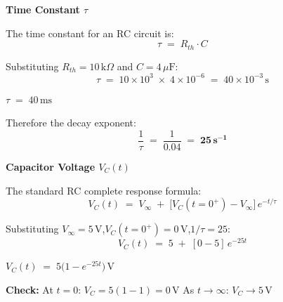 \documentclass[12pt]{beamer}
\begin{document}
\begin{frame}{\textbf{Time Constant $\tau$}}
  \begin{center}
    \vfill
    The time constant for an RC circuit is:
    \[
      \tau \;=\; R_{th} \cdot C
    \]

    \vspace{0.8em}
    Substituting $R_{th} = 10\,\mathrm{k}\Omega$ and $C = 4\,\mu\mathrm{F}$:
    \[
      \tau \;=\; 10 \times 10^{3} \;\times\; 4 \times 10^{-6}
           \;=\; 40 \times 10^{-3}\,\mathrm{s}
    \]

    \vspace{0.8em}
    \large\textbf{\textcolor{madblue}{$\tau \;=\; 40\,\mathrm{ms}$}}

    \vspace{1em}
    Therefore the decay exponent:
    \[
      \frac{1}{\tau} \;=\; \frac{1}{0.04} \;=\; \mathbf{25\,s^{-1}}
    \]
    \vfill
  \end{center}
\end{frame}

\begin{frame}{\textbf{Capacitor Voltage $V_C(t)$}}
  \begin{center}
    \vfill
    The standard RC complete response formula:
    \[
      V_C(t) \;=\; V_\infty \;+\; \bigl[V_C(t=0^+) - V_\infty\bigr]\,e^{-t/\tau}
    \]

    \vspace{0.8em}
    Substituting $V_\infty = 5\,\mathrm{V}$,\quad $V_C(t=0^+) = 0\,\mathrm{V}$,\quad $1/\tau = 25$:
    \[
      V_C(t) \;=\; 5 \;+\; [0 - 5]\,e^{-25t}
    \]

    \vspace{1em}
    \Large\textbf{\textcolor{madblue}{$V_C(t) \;=\; 5\bigl(1 - e^{-25t}\bigr)\,\mathrm{V}$}}

    \vspace{1.2em}
    \normalsize
    \textbf{Check:}\quad
    At $t=0$:\; $V_C = 5(1-1) = 0\,\mathrm{V}$ \;\textcolor{okgreen}{\checkmark}
    \qquad
    As $t\to\infty$:\; $V_C \to 5\,\mathrm{V}$ \;\textcolor{okgreen}{\checkmark}
    \vfill
  \end{center}
\end{frame}
\end{document}
